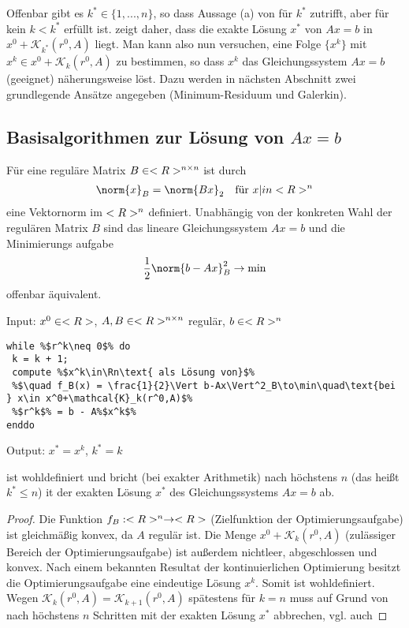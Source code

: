 \begin{remark}
	Offenbar gibt es $k^\ast\in\{1,...,n\}$, so dass Aussage (a) von  für $k^\ast$ zutrifft, aber für kein $k<k^\ast$ erfüllt ist.  zeigt daher, dass die exakte Lösung $x^\ast$ von $Ax=b$ in $x^0 + \mathcal{K}_{k^\ast}(r^0,A)$ liegt. Man kann also nun versuchen, eine Folge $\{x^k\}$ mit $x^k\in x^0 + \mathcal{K}_k(r^0,A)$ zu bestimmen, so dass $x^k$ das Gleichungssystem $Ax=b$ (geeignet) näherungsweise löst. Dazu werden in nächsten Abschnitt zwei grundlegende Ansätze angegeben (Minimum-Residuum und Galerkin).
\end{remark}

\subsection{Basisalgorithmen zur Lösung von $Ax=b$}

Für eine reguläre Matrix $B\in<R>^{n \times n}$ ist durch
\begin{align}
	\norm{x}_B = \norm{Bx}_2\quad\text{für } x|in\Rn\notag
\end{align}
eine Vektornorm im $<R>^n$ definiert. Unabhängig von der konkreten Wahl der regulären Matrix $B$ sind das lineare Gleichungssystem $Ax=b$ und die Minimierungs aufgabe
\begin{align}
	\frac{1}{2}\norm{b-Ax}_B^2\to\min\notag
\end{align}
offenbar äquivalent.

\begin{algorithm}
	Input: $x^0\in<R>$, $A,B\in<R>^{n \times n}$ regulär, $b\in<R>^n$
\begin{lstlisting}
while %$r^k\neq 0$% do
 k = k + 1;
 compute %$x^k\in\Rn\text{ als Lösung von}$%
 %$\quad f_B(x) = \frac{1}{2}\Vert b-Ax\Vert^2_B\to\min\quad\text{bei } x\in x^0+\mathcal{K}_k(r^0,A)$%
 %$r^k$% = b - A%$x^k$%
enddo
\end{lstlisting}
	Output: $x^\ast=x^k$, $k^\ast=k$
\end{algorithm}

\begin{proposition}
	 ist wohldefiniert und bricht (bei exakter Arithmetik) nach höchstens $n$ (das heißt $k^\ast\le n$) it der exakten Lösung $x^\ast$ des Gleichungssystems $Ax=b$ ab.
\end{proposition}
\begin{proof}
	Die Funktion $f_B:<R>^n\to<R>$ (Zielfunktion der Optimierungsaufgabe) ist gleichmäßig konvex, da $A$ regulär ist. Die Menge $x^0+\mathcal{K}_k(r^0,A)$ (zulässiger Bereich  der Optimierungsaufgabe) ist außerdem nichtleer, abgeschlossen und konvex.  Nach einem bekannten Resultat der kontinuierlichen Optimierung besitzt die Optimierungsaufgabe eine eindeutige Lösung $x^k$. Somit ist  wohldefiniert. Wegen $\mathcal{K}_k(r^0,A)=\mathcal{K}_{k+1}(r^0,A)$ spätestens für $k=n$ muss  auf Grund von  nach höchstens $n$ Schritten mit der exakten Lösung $x^\ast$ abbrechen, vgl. auch 
\end{proof}

